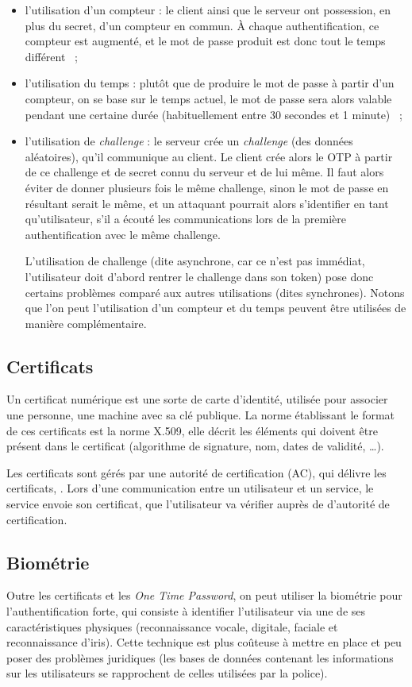 \begin{itemize}
  \item l'utilisation d'un compteur : le client ainsi que le
serveur ont possession, en plus du secret, d'un compteur en
commun. À chaque authentification, ce compteur est augmenté, et le
mot de passe produit est donc tout le temps différent ~;
  \item l'utilisation du temps : plutôt que de produire le mot de
passe à partir d'un compteur, on se base sur le temps actuel, le
mot de passe sera alors valable pendant une certaine durée
(habituellement entre 30 secondes et 1 minute) ~;
  \item l'utilisation de \emph{challenge} : le serveur crée un
\emph{challenge} (des données aléatoires), qu'il communique au
client. Le client crée alors le OTP à partir de ce challenge et de
secret connu du serveur et de lui même. Il faut alors éviter de
donner plusieurs fois le même challenge, sinon le mot de passe en
résultant serait le même, et un attaquant pourrait alors
s'identifier en tant qu'utilisateur, s'il a écouté les
communications lors de la première authentification avec le même
challenge. 

L'utilisation de challenge (dite asynchrone, car ce n'est pas
immédiat, l'utilisateur doit d'abord rentrer le challenge dans 
son token) pose donc certains problèmes comparé aux autres 
utilisations (dites synchrones). Notons que l'on peut
l'utilisation d'un compteur et du temps peuvent être utilisées de
manière complémentaire.

\end{itemize}

\subsection{Certificats}
Un certificat numérique est une sorte de carte d'identité,
utilisée pour associer une personne, une machine avec sa clé
publique.
La norme établissant le format de ces certificats est la norme
X.509, elle décrit les éléments qui doivent être présent dans le
certificat (algorithme de signature, nom, dates de validité, …).

Les certificats sont gérés par une autorité de certification (AC),
qui délivre les certificats, .
Lors d'une communication entre un utilisateur et un service,
le service envoie son certificat, que l'utilisateur va vérifier
auprès de d'autorité de certification.


\subsection{Biométrie}
Outre les certificats et les \emph{One Time Password}, on peut
utiliser la biométrie pour l'authentification forte, qui consiste
à identifier l'utilisateur via une de ses caractéristiques
physiques (reconnaissance vocale, digitale, faciale et
reconnaissance d'iris).
Cette technique est plus coûteuse à mettre en place et peu poser
des problèmes juridiques (les bases de données contenant les
informations sur les utilisateurs se rapprochent de celles
utilisées par la police).
